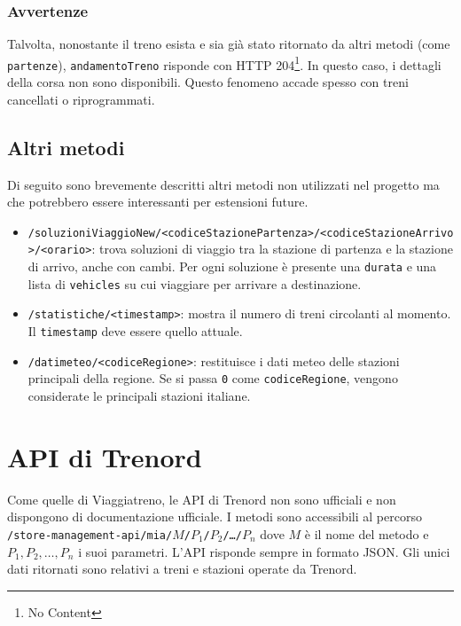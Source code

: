 \documentclass[12pt,a4paper,italian]{report}
\begin{document}
\subsubsection{Avvertenze}

Talvolta, nonostante il treno esista e sia già stato ritornato da
altri metodi (come \texttt{partenze}), \texttt{andamentoTreno}
risponde con HTTP 204\footnote{No Content}.  In questo caso, i
dettagli della corsa non sono disponibili.  Questo fenomeno accade
spesso con treni cancellati o riprogrammati.

\subsection{Altri metodi}

Di seguito sono brevemente descritti altri metodi non utilizzati nel
progetto ma che potrebbero essere interessanti per estensioni future.

\begin{itemize}
    \item
    \texttt{/soluzioniViaggioNew/\-<codiceStazionePartenza>/\-<codiceStazioneArrivo>/\-<orario>}:
    trova soluzioni di viaggio tra la stazione di partenza e la
    stazione di arrivo, anche con cambi.  Per ogni soluzione è
    presente una \texttt{durata} e una lista di \texttt{vehicles} su
    cui viaggiare per arrivare a destinazione.
    \item \texttt{/statistiche/<timestamp>}: mostra il numero di treni
    circolanti al momento. Il \texttt{timestamp} deve essere quello
    attuale.
    \item \texttt{/datimeteo/\-<codiceRegione>}: restituisce i dati
    meteo delle stazioni principali della regione. Se si passa
    \texttt{0} come \texttt{codiceRegione}, vengono considerate le
    principali stazioni italiane.
\end{itemize}

\section{API di Trenord}

Come quelle di Viaggiatreno, le API di Trenord non sono ufficiali e
non dispongono di documentazione ufficiale.  I metodi sono accessibili
al percorso
\texttt{/\-store-management-api/\-mia/\-$M$/\-$P_1$/\-$P_2$/\-\dots/\-$P_n$}
dove $M$ è il nome del metodo e $P_1, P_2, \dots, P_n$ i suoi
parametri.  L'API risponde sempre in formato JSON\@.  Gli unici dati
ritornati sono relativi a treni e stazioni operate da Trenord.
\end{document}
